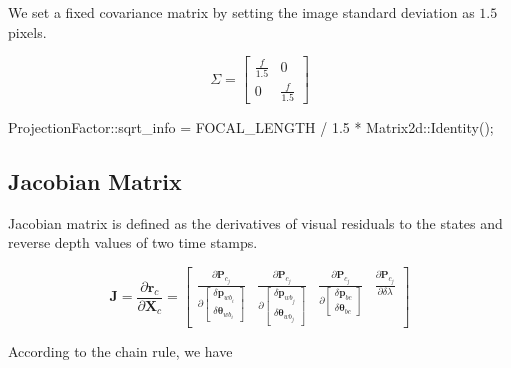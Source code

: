 \documentclass[12pt]{report}   %
\begin{document}
We set a fixed covariance matrix by setting the image standard deviation as $1.5$ pixels.

\begin{equation}
\Sigma = 
\begin{bmatrix}
\frac{f}{1.5} & 0 \\
0 & \frac{f}{1.5}
\end{bmatrix}
\end{equation}

\begin{cppcode}
ProjectionFactor::sqrt_info = FOCAL_LENGTH / 1.5 * Matrix2d::Identity();
\end{cppcode}


\subsection{Jacobian Matrix}

Jacobian matrix is defined as the derivatives of visual residuals to the states and reverse depth values of two time stamps.

\begin{equation}
\mathbf{J} = 
\frac{\partial \mathbf{r}_{c}}{\partial \mathbf{X}_{c}} =
\begin{bmatrix}
\frac{\partial \mathbf{P}_{c_{j}}}
{\partial\left[\begin{array}{c}{\delta \mathbf{p}_{w b_{i}}} \\ 
	{\delta \boldsymbol{\theta}_{w b_{i}}}\end{array}\right]} 
&
\frac{\partial \mathbf{P}_{c_{j}}}
{\partial\left[\begin{array}{c}{\delta \mathbf{p}_{w b_{j}}} \\ 
	{\delta \boldsymbol{\theta}_{w b_{j}}}\end{array}\right]} 
&
\frac{\partial \mathbf{P}_{c_{j}}}
{\partial\left[\begin{array}{c}{\delta \mathbf{p}_{bc}} \\ 
	{\delta \boldsymbol{\theta}_{bc}}\end{array}\right]} 
&
\frac{\partial \mathbf{P}_{c_{j}}}{\partial \delta \lambda}
\end{bmatrix} \label{jacobian}
\end{equation}

According to the chain rule, we have
\end{document}
